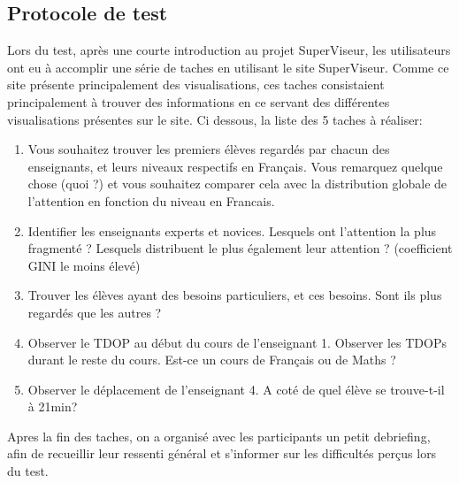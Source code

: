 \documentclass{article}
\begin{document}
\subsection{Protocole de test}
Lors du test, après une courte introduction au projet SuperViseur, les utilisateurs ont eu à accomplir une série de taches en utilisant le site SuperViseur. Comme ce site présente principalement des visualisations, ces taches consistaient principalement à trouver des informations en ce servant des différentes visualisations présentes sur le site. Ci dessous, la liste des 5 taches à réaliser:
\begin{enumerate}
    \item Vous souhaitez trouver les premiers élèves regardés par chacun des enseignants, et leurs niveaux respectifs en Français. Vous remarquez quelque chose (quoi ?) et vous souhaitez comparer cela avec la distribution globale de l'attention en fonction du niveau en Francais.
    \item Identifier les enseignants experts et novices. Lesquels ont l'attention la plus fragmenté ? Lesquels distribuent le plus également leur attention ? (coefficient GINI le moins élevé)
    \item Trouver les élèves ayant des besoins particuliers, et ces besoins. Sont ils plus regardés que les autres ?
    \item Observer le TDOP au début du cours de l'enseignant 1. Observer les TDOPs durant le reste du cours. Est-ce un cours de Français ou de Maths ?
    \item Observer le déplacement de l'enseignant 4. A coté de quel élève se trouve-t-il à 21min?
\end{enumerate}
Apres la fin des taches, on a organisé avec les participants un petit debriefing, afin de recueillir leur ressenti général et s'informer sur les difficultés perçus lors du test.
\end{document}
